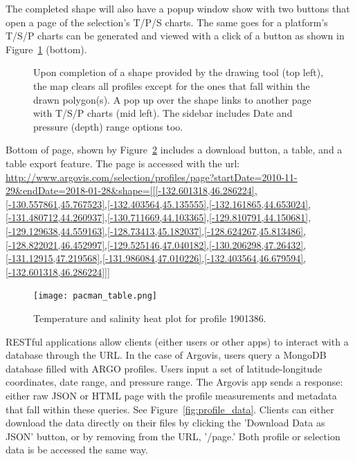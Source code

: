 The completed shape will also have a popup window show with two buttons that open a page of the selection's T/P/S charts. The same goes for a platform's T/S/P charts can be generated and viewed with a click of a button as shown in Figure~\ref{fig:heart_sel} (bottom).

\begin{figure}[H]
\caption{\label{fig:heart_sel} Upon completion of a shape provided by the drawing tool (top left), the map clears all profiles except for the ones that fall within the drawn polygon(s). A pop up over the shape links to another page with T/S/P charts (mid left). The sidebar includes Date and pressure (depth) range options too.}
\end{figure}

Bottom of page, shown by Figure~\ref{fig:pacman_table} includes a download button, a table, and a table export feature. The page is accessed with the url: \url{http://www.argovis.com/selection/profiles/page?startDate=2010-11-29&endDate=2018-01-28&shape=[[[-132.601318,46.286224],[-130.557861,45.767523],[-132.403564,45.135555],[-132.161865,44.653024],[-131.480712,44.260937],[-130.711669,44.103365],[-129.810791,44.150681],[-129.129638,44.559163],[-128.73413,45.182037],[-128.624267,45.813486],[-128.822021,46.452997],[-129.525146,47.040182],[-130.206298,47.26432],[-131.12915,47.219568],[-131.986084,47.010226],[-132.403564,46.679594],[-132.601318,46.286224]]]}

\begin{figure}[H]
\begin{minipage}{6in}
\centering
\texttt{[image: pacman\_table.png]}
\caption{\label{fig:pacman_table}Temperature and salinity heat plot for profile 1901386.}
\end{minipage}
\end{figure}

RESTful applications allow clients (either users or other apps) to interact with a database through the URL. In the case of Argovis, users query a MongoDB database filled with ARGO profiles. Users input a set of latitude-longitude coordinates, date range, and pressure range. The Argovis app sends a response: either raw JSON or HTML page with the profile measurements and metadata that fall within these queries. See Figure~\ref{fig:profile_data}. Clients can either download the data directly on their files by clicking the 'Download Data as JSON' button, or by removing from the URL, '/page.' Both profile or selection data is be accessed the same way.

